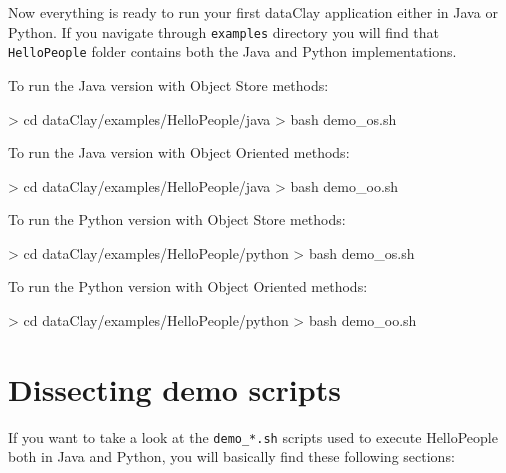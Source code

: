 Now everything is ready to run your first dataClay application either in Java or Python. If you navigate through \texttt{examples} directory you will find that \texttt{HelloPeople} folder contains both the Java and Python implementations.

To run the Java version with Object Store methods:

\begin{tBox}
 \begin{bash}
  > cd dataClay/examples/HelloPeople/java
  > bash demo_os.sh
 \end{bash}
\end{tBox}

To run the Java version with Object Oriented methods:

\begin{tBox}
 \begin{bash}
  > cd dataClay/examples/HelloPeople/java
  > bash demo_oo.sh
 \end{bash}
\end{tBox}

To run the Python version with Object Store methods:

\begin{tBox}
 \begin{bash}
  > cd dataClay/examples/HelloPeople/python
  > bash demo_os.sh
 \end{bash}
\end{tBox}

To run the Python version with Object Oriented methods:

\begin{tBox}
 \begin{bash}
  > cd dataClay/examples/HelloPeople/python
  > bash demo_oo.sh
 \end{bash}
\end{tBox}

\section{Dissecting demo scripts}

If you want to take a look at the \texttt{demo\_*.sh} scripts used to execute HelloPeople both in Java and Python, you will basically find these following sections:

